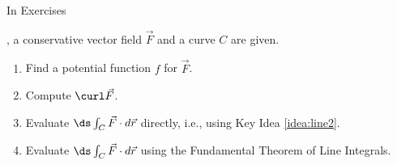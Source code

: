 {\noindent In Exercises}
{, a conservative vector field $\vec F$ and a curve $C$ are given.
\begin{enumerate}
\item	Find a potential function $f$ for $\vec F$. 
\item	Compute $\curl \vec F$.
\item	Evaluate $\ds\int_C \vec F\cdot d\vec r$ directly, i.e., using Key Idea \ref{idea:line2}.
\item	Evaluate $\ds\int_C \vec F\cdot d\vec r$  using the Fundamental Theorem of Line Integrals.
\end{enumerate}%
}
